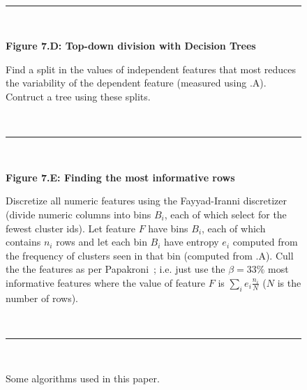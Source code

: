 \begin{figure}
\begin{shaded}
	   ~\hrule~
	   
	{\bf Figure 7.D: Top-down division with Decision Trees}
	
	Find a split in the values of  independent features that most reduces the variability
  of the dependent feature (measured using .A). Contruct a tree using these splits.
	
	 ~\hrule~
	 
	 	{\bf Figure 7.E: Finding the most informative rows}
	

Discretize all numeric features using the Fayyad-Iranni discretizer~\cite{FayIra93Multi}
(divide numeric columns into bins $B_i$, each of which  select for the fewest cluster ids).
Let feature $F$ have bins $B_i$, each of which contains $n_i$ rows
and 
let each bin $B_i$ have entropy $e_i$ computed from the frequency of clusters seen in that bin (computed from .A).
Cull the the features as per Papakroni~\cite{papa13}; i.e. just use the $\beta=33\%$ most informative features
where  the   value of  feature $F$ is $\sum_i e_i\frac{n_i}{N}$ ($N$ is the number of rows).

~\hrule~ 

	  \end{shaded}
		\caption{Some algorithms used in this paper.}\label{fig:where}
		\end{figure}